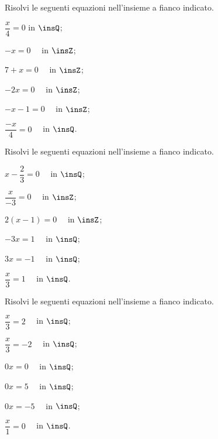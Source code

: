 \begin{esercizio}
\label{ese:13.21}
Risolvi le seguenti equazioni nell'insieme a fianco indicato.
\begin{multicols}{3}
\begin{enumeratea}
\spazielenx
 \item $\dfrac{x}{4}=0$ in $\insQ$;
 \item $-x=0\quad$ in $\insZ$;
 \item $7+x=0\quad$ in $\insZ$;
 \item $-2x=0\quad$ in $\insZ$;
 \item $-x-1=0\quad$ in $\insZ$;
 \item $\dfrac{-x}{4}=0\quad$ in $\insQ$.
\end{enumeratea}
\end{multicols}
\end{esercizio}

\begin{esercizio}
\label{ese:13.22}
Risolvi le seguenti equazioni nell'insieme a fianco indicato.
\begin{multicols}{3}
\begin{enumeratea}
\spazielenx
 \item $x-\dfrac{2}{3}=0\quad$ in $\insQ$;
 \item $\dfrac{x}{-3}=0\quad$ in $\insZ$;
 \item $2(x-1)=0\quad$ in $\insZ$;
 \item $-3x=1\quad$ in $\insQ$;
 \item $3x=-1\quad$ in $\insQ$;
 \item $\dfrac{x}{3}=1\quad$ in $\insQ$.
\end{enumeratea}
\end{multicols}
\end{esercizio}

\begin{esercizio}
\label{ese:13.23}
Risolvi le seguenti equazioni nell'insieme a fianco indicato.
\begin{multicols}{3}
\begin{enumeratea}
\spazielenx
 \item $\dfrac{x}{3}=2\quad$ in $\insQ$;
 \item $\dfrac{x}{3}=-2\quad$ in $\insQ$;
 \item $0x=0\quad$ in $\insQ$;
 \item $0x=5\quad$ in $\insQ$;
 \item $0x=-5\quad$ in $\insQ$;
 \item $\dfrac{x}{1}=0\quad$ in $\insQ$.
\end{enumeratea}
\end{multicols}
\end{esercizio}

